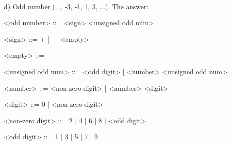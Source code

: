 \documentclass{article}
\begin{document}
	\paragraph{}
	\rmfamily
	
			d) Odd number (..., -3, -1, 1, 3, ...). The answer:
	\ttfamily
	\begin{grammar}
	
		<odd number> ::= <sign> <unsigned odd num>
		
		<sign> ::= + | - | <empty>
		
		<empty> ::= \
		
		<unsigned odd num> ::= <odd digit> | <number> <unsigned odd num>
		
		<number> ::= <non-zero digit> | <number> <digit>
		
		<digit> ::= 0 | <non-zero digit>
		
		<non-zero digit> ::= 2 | 4 | 6 | 8 | <odd digit>
		
		<odd digit> ::= 1 | 3 | 5 | 7 | 9
		
	\end{grammar}
\end{document}
